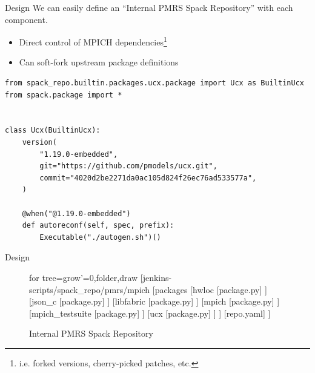 \documentclass{beamer}
\begin{document}
\begin{frame}[fragile]{Design}
	We can easily define an ``Internal PMRS Spack Repository'' with each
	component.
	\pause
	\begin{itemize}
		\item Direct control of MPICH dependencies\footnote{i.e. forked
			versions, cherry-picked patches, etc.}
			\pause
		\item Can soft-fork upstream package definitions
			\pause
	\end{itemize}

	\begin{examples}
		\begin{verbatim}
from spack_repo.builtin.packages.ucx.package import Ucx as BuiltinUcx
from spack.package import *


class Ucx(BuiltinUcx):
	version(
		"1.19.0-embedded",
		git="https://github.com/pmodels/ucx.git",
		commit="4020d2be2271da0ac105d824f26ec76ad533577a",
	)

	@when("@1.19.0-embedded")
	def autoreconf(self, spec, prefix):
		Executable("./autogen.sh")()
		\end{verbatim}
	\end{examples}
\end{frame}

\begin{frame}{Design}
	\begin{figure}
		\tiny
		\centering
		\begin{forest}
			for tree={grow'=0,folder,draw}
			[jenkins-scripts/spack\_repo/pmrs/mpich
			[packages
			[hwloc
			[package.py]
			]
			[json\_c
			[package.py]
			]
			[libfabric
			[package.py]
			]
			[mpich
			[package.py]
			]
			[mpich\_testsuite
			[package.py]
			]
			[ucx
			[package.py]
			]
			]
			[repo.yaml]
			]
		\end{forest}
		\caption{Internal PMRS Spack Repository}
	\end{figure}
\end{frame}
\end{document}
